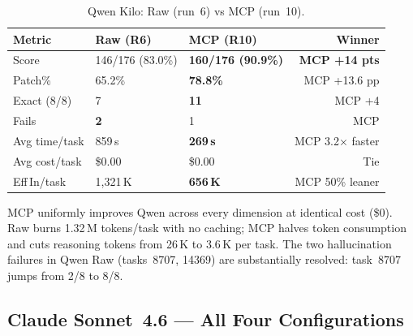 \begin{table}[h]
\centering
\caption{Qwen Kilo: Raw (run~6) vs MCP (run~10).}\label{tab:delta-qwen}
\begin{tabular}{lllr}
\toprule
\textbf{Metric} & \textbf{Raw (R6)} & \textbf{MCP (R10)} & \textbf{Winner} \\
\midrule
Score          & 146/176 (83.0\%) & \textbf{160/176 (90.9\%)} & \textbf{MCP +14 pts} \\
Patch\%        & 65.2\%           & \textbf{78.8\%}            & MCP +13.6 pp \\
Exact (8/8)    & 7                & \textbf{11}                & MCP +4 \\
Fails          & \textbf{2}       & 1                          & MCP \\
Avg time/task  & 859\,s           & \textbf{269\,s}            & MCP 3.2$\times$ faster \\
Avg cost/task  & \$0.00           & \$0.00                     & Tie \\
Eff\,In/task   & 1,321\,K         & \textbf{656\,K}            & MCP 50\% leaner \\
\bottomrule
\end{tabular}
\end{table}

\noindent
MCP uniformly improves Qwen across every dimension at identical cost (\$0).
Raw burns 1.32\,M tokens/task with no caching; MCP halves token consumption
and cuts reasoning tokens from 26\,K to 3.6\,K per task.
The two hallucination failures in Qwen Raw (tasks~8707, 14369) are substantially
resolved: task~8707 jumps from 2/8 to 8/8.

\subsection{Claude Sonnet~4.6 --- All Four Configurations}

